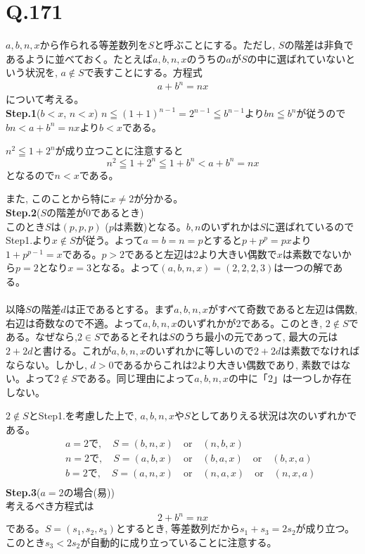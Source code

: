 \documentclass[twocolumn]{jbook}
\newcommand{\beqn}{\begin{eqnarray*}}
\newcommand{\eeqn}{\end{eqnarray*}}
\newcommand{\mr}{\mathrm}
\renewcommand{\leq}{\leqq}
\newcommand{\step}[2]{{\Large \textbf{Step.#1}}(#2)}
\begin{document}
\section*{Q.171}
$a,b,n,x$から作られる等差数列を$S$と呼ぶことにする。ただし, $S$の階差は非負であるように並べておく。たとえば$a,b,n,x$のうちの$a$が$S$の中に選ばれていないという状況を, $a\notin S$で表すことにする。方程式
\begin{eqnarray}
a+b^{n} = nx \label{eqnarray:1}
\end{eqnarray}
について考える。\\
\step{1}{$b<x$, $n<x$}
$n\leq (1+1)^{n-1} = 2^{n-1} \leq b^{n-1}$より$bn\leq b^{n}$が従うので$bn<a+b^{n} = nx$より$b<x$である。\par
$n^2 \leq 1+2^{n}$が成り立つことに注意すると
\[n^2 \leq 1 + 2^{n} \leq 1+ b^{n} < a+b^{n}=nx\]
となるので$n<x$である。\par
また, このことから特に$x\neq 2$が分かる。
\\
\step{2}{$S$の階差が$0$であるとき}\\
このとき$S$は$(p,p,p)$  ($p$は素数)となる。$b,n$のいずれかは$S$に選ばれているのでStep1.より$x\notin S$が従う。よって$a=b=n=p$とすると$p+p^{p} = px$より$1+p^{p-1} = x$である。$p>2$であると左辺は2より大きい偶数で$x$は素数でないから$p=2$となり$x=3$となる。よって$(a,b,n,x) = (2,2,2,3)$は一つの解である。\\
\\
以降$S$の階差$d$は正であるとする。まず$a,b,n,x$がすべて奇数であると左辺は偶数, 右辺は奇数なので不適。よって$a,b,n,x$のいずれかが$2$である。このとき, $2\notin S$である。なぜなら,$2\in S$であるとそれは$S$のうち最小の元であって, 最大の元は$2+2d$と書ける。これが$a,b,n,x$のいずれかに等しいので$2+2d$は素数でなければならない。しかし, $d>0$であるからこれは2より大きい偶数であり, 素数ではない。よって$2\notin S$である。同じ理由によって$a,b,n,x$の中に「$2$」は一つしか存在しない。\par
$2\notin S$とStep1.を考慮した上で, $a,b,n,x$や$S$としてありえる状況は次のいずれかである。
\beqn
&&a=2で,\quad  S=(b,n,x) \quad \mr{or} \quad (n,b,x)\\
&&n=2で,\quad S=(a,b,x)\quad \mr{or} \quad (b,a,x)\quad \mr{or} \quad (b,x,a)\\
&&b=2で,\quad S=(a,n,x)\quad \mr{or}\quad (n,a,x)\quad \mr{or} \quad (n,x,a)\\
\eeqn
\step{3}{$a=2$の場合(易)}\\
考えるべき方程式は
\[2+b^{n} = nx\]
である。$S=(s_1,s_2,s_3)$とするとき, 等差数列だから$s_1+s_3 = 2s_2$が成り立つ。このとき$s_3 < 2s_2$が自動的に成り立っていることに注意する。\\
\end{document}
